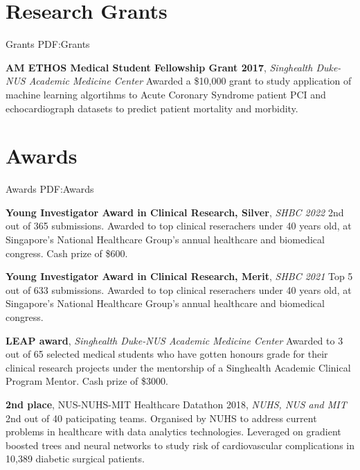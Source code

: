 \documentclass[letterpaper,10pt,oneside]{article}
\begin{document}
\begin{body}
\begin{enumerate}
\end{enumerate}


\section
{Research Grants}
{Grants}
{PDF:Grants}

\textbf{AM ETHOS Medical Student Fellowship Grant 2017},
\hfill{}
\GapNoBreak
\textit{Singhealth Duke-NUS Academic Medicine Center}
\GapNoBreak
\BulletItem
Awarded a \$10,000 grant to study application of machine learning algortihms to Acute Coronary Syndrome patient PCI and echocardiograph datasets to predict patient mortality and morbidity.
\GapNoBreak



\section
{Awards}
{Awards}
{PDF:Awards}

\textbf{Young Investigator Award in Clinical Research, Silver}, \textit{SHBC 2022}
\hfill{}
\GapNoBreak
\BulletItem
2nd out of 365 submissions. Awarded to top clinical reserachers under 40 years old, at Singapore's National Healthcare Group's annual healthcare and biomedical congress. Cash prize of \$600.
\GapNoBreak
\medskip

\textbf{Young Investigator Award in Clinical Research, Merit}, \textit{SHBC 2021}
\hfill{}
\GapNoBreak
\BulletItem
Top 5 out of 633 submissions. Awarded to top clinical reserachers under 40 years old, at Singapore's National Healthcare Group's annual healthcare and biomedical congress. 
\GapNoBreak
\medskip

\textbf{LEAP award}, \textit{Singhealth Duke-NUS Academic Medicine Center}
\hfill{}
\GapNoBreak
\BulletItem
Awarded to 3 out of 65 selected medical students who have gotten honours grade for their clinical research projects under the mentorship of a Singhealth Academic Clinical Program Mentor. Cash prize of \$3000.
\GapNoBreak
\medskip

\textbf{2nd place}, \textcolor{mygray}{NUS-NUHS-MIT Healthcare Datathon 2018}, \textit{NUHS, NUS and MIT}
\hfill{}
\GapNoBreak
\BulletItem
2nd out of 40 paticipating teams. Organised by NUHS to address current problems in healthcare with data analytics technologies. Leveraged on gradient boosted trees and neural networks to study risk of cardiovascular complications in 10,389 diabetic surgical patients.
\GapNoBreak
\medskip


\end{body}
\end{document}
